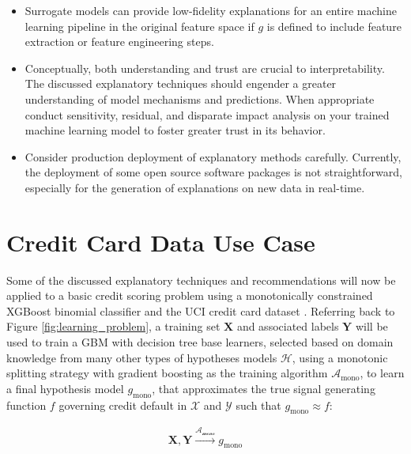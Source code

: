 \documentclass[sigconf, review]{acmart}
\begin{document}
\begin{itemize}
	\item Surrogate models can provide low-fidelity explanations for an entire machine learning pipeline in the original feature space if $g$ is defined to include feature extraction or feature engineering steps.\\
	
	\item Conceptually, both understanding and trust are crucial to interpretability. The discussed explanatory techniques should engender a greater understanding of model mechanisms and predictions. When appropriate conduct sensitivity, residual, and disparate impact analysis on your trained machine learning model to foster greater trust in its behavior.\\
	
	\item Consider production deployment of explanatory methods carefully. Currently, the deployment of some open source software packages is not straightforward, especially for the generation of explanations on new data in real-time.\\
	
\end{itemize}

\section{Credit Card Data Use Case} \label{sec:use_case}

Some of the discussed explanatory techniques and recommendations will now be applied to a basic credit scoring problem using a monotonically constrained XGBoost binomial classifier and the UCI credit card dataset \cite{uci}. Referring back to Figure \ref{fig:learning_problem}, a training set $\mathbf{X}$ and associated labels $\mathbf{Y}$ will be used to train a GBM with decision tree base learners, selected based on domain knowledge from many other types of hypotheses models $\mathcal{H}$, using a monotonic splitting strategy with gradient boosting as the training algorithm $\mathcal{A}_{\text{mono}}$, to learn a final hypothesis model $g_{\text{mono}}$, that approximates the true signal generating function $f$ governing credit default in $\mathcal{X}$ and $\mathcal{Y}$ such that $g_{\text{mono}} \approx f$:

\begin{equation}
\label{eq:cc_training}
\begin{aligned}
\mathbf{X}, \mathbf{Y} \xrightarrow{\mathcal{A_{\text{mono}}}} g_{\text{mono}}
\end{aligned}
\end{equation}
\end{document}
